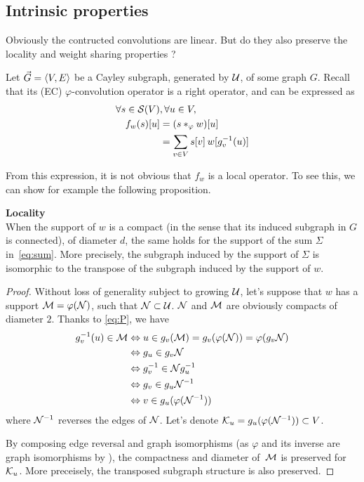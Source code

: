 \subsection{Intrinsic properties}

Obviously the contructed convolutions are linear. But do they also preserve the locality and weight sharing properties ?

Let $\vgve$ be a Cayley subgraph, generated by $\cu$, of some graph $G$. Recall that its (EC) $\varphi$-convolution operator is a right operator, and can be expressed as
\begin{align}
\forall s \in \cs(V) &, \forall u \in V,\nonumber\\
f_w(s)[u] & = (s \ast_{\varphi} w) [u]\nonumber\\
          & = \displaystyle\sum_{v \in V} s[v] \h{2} w[g_v^{-1}(u)] \label{eq:sum}
\end{align}

From this expression, it is not obvious that $f_w$ is a local operator. To see this, we can show for example the following proposition.

\begin{proposition}\textbf{Locality}\\
When the support of $w$ is a compact (in the sense that its induced subgraph in $G$ is connected), of diameter $d$, the same holds for the support of the sum $\Sigma$ in~\eqref{eq:sum}. More precisely, the subgraph induced by the support of $\Sigma$ is isomorphic to the transpose of the subgraph induced by the support of $w$.
\end{proposition}

\begin{proof}
Without loss of generality subject to growing $\cu$, let's suppose that $w$ has a support $\cm = \varphi(\cn)$, such that $\cn \subset \cu$. $\cn$ and $\cm$ are obviously compacts of diameter $2$. Thanks to \eqref{eq:P}, we have 
\begin{align*}
g_v^{-1}(u) \in \cm & \Leftrightarrow u \in g_v(\cm) = g_v(\varphi(\cn)) = \varphi(g_v\cn)\\
& \Leftrightarrow g_u \in g_v\cn\\
& \Leftrightarrow g_v^{-1} \in \cn g_u^{-1}\\
& \Leftrightarrow g_v \in g_u \cn^{-1}\\
& \Leftrightarrow v \in g_u(\varphi(\cn^{-1}))\\
\end{align*}
where $\cn^{-1}$ reverses the edges of $\cn$. Let's denote $\ck_u = g_u(\varphi(\cn^{-1})) \subset V$.

By composing edge reversal and graph isomorphisms (as $\varphi$ and its inverse are graph isomorphisms by ), the compactness and diameter of~$\cm$ is preserved for $\ck_u$. More preceisely, the transposed subgraph structure is also preserved.
\end{proof}

